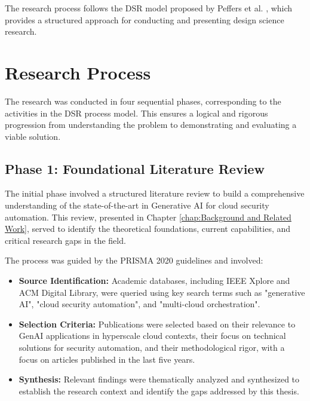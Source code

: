 The research process follows the DSR model proposed by Peffers et al. \cite{peffers_design_2007}, which provides a structured approach for conducting and presenting design science research.

\section{Research Process}
\label{sec:research_process}
The research was conducted in four sequential phases, corresponding to the activities in the DSR process model. This ensures a logical and rigorous progression from understanding the problem to demonstrating and evaluating a viable solution.

\subsection{Phase 1: Foundational Literature Review}
The initial phase involved a structured literature review to build a comprehensive understanding of the state-of-the-art in Generative AI for cloud security automation. This review, presented in Chapter \ref{chap:Background and Related Work}, served to identify the theoretical foundations, current capabilities, and critical research gaps in the field.

The process was guided by the PRISMA 2020 guidelines \cite{page_prisma_2021-1} and involved:
\begin{itemize}
    \item \textbf{Source Identification:} Academic databases, including IEEE Xplore and ACM Digital Library, were queried using key search terms such as "generative AI", "cloud security automation", and "multi-cloud orchestration".
    \item \textbf{Selection Criteria:} Publications were selected based on their relevance to GenAI applications in hyperscale cloud contexts, their focus on technical solutions for security automation, and their methodological rigor, with a focus on articles published in the last five years.
    \item \textbf{Synthesis:} Relevant findings were thematically analyzed and synthesized to establish the research context and identify the gaps addressed by this thesis.
\end{itemize}

